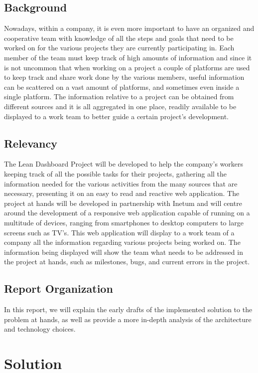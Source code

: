 \documentclass[a4paper,twoside,10pt]{report}
\begin{document}
\section{Background}
Nowadays, within a company, it is even more important to have an organized and cooperative team with knowledge of all the steps and goals that need to be worked on for the various projects they are currently participating in.
Each member of the team must keep track of high amounts of information and since it is not uncommon that when working on a project a couple of platforms are used to keep track and share work done by the various members, useful information can be scattered on a vast amount of platforms, and sometimes even inside a single platform.
The information relative to a project can be obtained from different sources and it is all aggregated in one place, readily available to be displayed to a work team to better guide a certain project's development.

\section{Relevancy}
The Lean Dashboard Project will be developed to help the company's workers keeping track of all the possible tasks for their projects, gathering all the information needed for the various activities from the many sources that are necessary, presenting it on an easy to read and reactive web application.
The project at hands will be developed in partnership with Inetum\cite{INETUM} and will centre around the development of a responsive web application capable of running on a multitude of devices, ranging from smartphones to desktop computers to large screens such as TV’s. This web application will display to a work team of a company all the information regarding various projects being worked on. 
The information being displayed will show the team what needs to be addressed in the project at hands, such as milestones, bugs, and current errors in the project.

\section{Report Organization}
In this report, we will explain the early drafts of the implemented solution to the problem at hands, as well as provide a more in-depth analysis of the architecture and technology choices.

\chapter{Solution}
\end{document}
